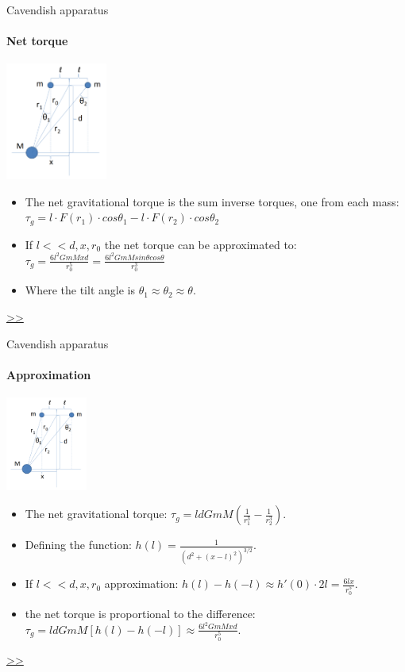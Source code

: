 \documentclass{beamer}
\begin{document}
\begin{frame}{Cavendish apparatus}
	\framesubtitle{Net torque}
	\begin{center}		
		\includegraphics[width=0.25\textwidth,keepaspectratio]{Cavendish apparatus.PNG}
    \end{center}
	\begin{itemize}
		\item The net gravitational torque is the sum inverse torques, one from each mass: $\tau_g = l \cdot F(r_1) \cdot cos\theta_1 - l \cdot F(r_2) \cdot cos\theta_2$
		\item If $l<<d,x,r_0$ the net torque can be approximated to: $\tau_g =  \frac{6l^2GmMxd} {r_0^5} = \frac{6l^2GmM sin\theta cos\theta}{r_0^3}$
		\item Where the tilt angle is $\theta_1 \approx \theta_2 \approx \theta$.
	\end{itemize}
	\hyperlink{frame:Gravimetric sensing}{>>} 
\end{frame}
\begin{frame}{Cavendish apparatus}
	\framesubtitle{Approximation}
	\begin{center}		
		\includegraphics[width=0.2\textwidth,keepaspectratio]{Cavendish apparatus.PNG}
    \end{center}
	\begin{itemize}
		\item The net gravitational torque: $\tau_g =  l d GmM(\frac{1}{r_1^3} - \frac{1}{r_2^3})$.
		\item Defining the function: $h(l) = \frac{1}{(d^2 +(x-l)^2)^{3/2}}$.
		\item If $l<<d,x,r_0$ approximation: $h(l)-h(-l)\approx h'(0)\cdot 2l = \frac{6lx}{r_0^5}$.
		\item the net torque is proportional to the difference: $\tau_g = l d GmM[h(l)-h(-l)]\approx \frac{6l^2GmMxd} {r_0^5}$.
	\end{itemize}
	\hyperlink{frame:Gravimetric sensing}{>>} 
\end{frame}
\end{document}
